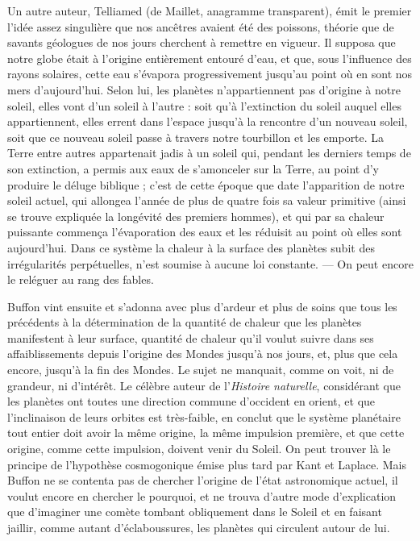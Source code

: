 \documentclass[a4paper, 11pt, oneside]{article}
\begin{document}
Un autre auteur, Telliamed (de Maillet, anagramme transparent), émit le premier l'idée assez singulière que nos ancêtres avaient été des poissons, théorie que de savants géologues de nos jours cherchent à remettre en vigueur. Il supposa que notre globe était à l'origine entièrement entouré d'eau, et que, sous l'influence des rayons solaires, cette eau s'évapora progressivement jusqu'au point où en sont nos mers d'aujourd'hui. Selon lui, les planètes n'appartiennent pas d'origine à notre soleil, elles vont d'un soleil à l'autre : soit qu'à l'extinction du soleil auquel elles appartiennent, elles errent dans l'espace jusqu'à la rencontre d'un nouveau soleil, soit que ce nouveau soleil passe à travers notre tourbillon et les emporte. La Terre entre autres appartenait jadis à un soleil qui, pendant les derniers temps de son extinction, a permis aux eaux de s'amonceler sur la Terre, au point d'y produire le déluge biblique ; c'est de cette époque que date l'apparition de notre soleil actuel, qui allongea l'année de plus de quatre fois sa valeur primitive (ainsi se trouve expliquée la longévité des premiers hommes), et qui par sa chaleur puissante commença l'évaporation des eaux et les réduisit au point où elles sont aujourd'hui. Dans ce système la chaleur à la surface des planètes subit des irrégularités perpétuelles, n'est soumise à aucune loi constante. --- On peut encore le reléguer au rang des fables.

Buffon vint ensuite et s'adonna avec plus d'ardeur et plus de soins que tous les précédents à la détermination de la quantité de chaleur que les planètes manifestent à leur surface, quantité de chaleur qu'il voulut suivre dans ses affaiblissements depuis l'origine des Mondes jusqu'à nos jours, et, plus que cela encore, jusqu'à la fin des Mondes. Le sujet ne manquait, comme on voit, ni de grandeur, ni d'intérêt. Le célèbre auteur de l'\emph{Histoire naturelle}, considérant que les planètes ont toutes une direction commune d'occident en orient, et que l'inclinaison de leurs orbites est très-faible, en conclut que le système planétaire tout entier doit avoir la même origine, la même impulsion première, et que cette origine, comme cette impulsion, doivent venir du Soleil. On peut trouver là le principe de l'hypothèse cosmogonique émise plus tard par Kant et Laplace. Mais Buffon ne se contenta pas de chercher l'origine de l'état astronomique actuel, il voulut encore en chercher le pourquoi, et ne trouva d'autre mode d'explication que d'imaginer une comète tombant obliquement dans le Soleil et en faisant jaillir, comme autant d'éclaboussures, les planètes qui circulent autour de lui.
\end{document}
